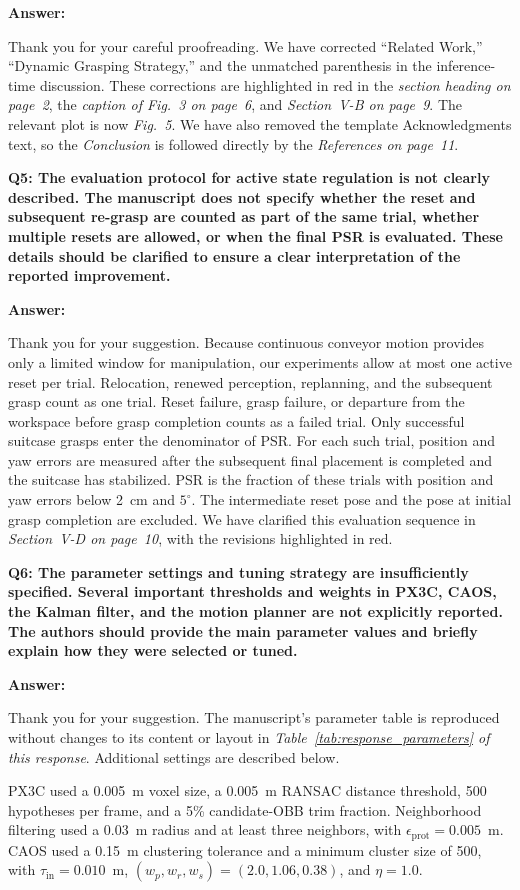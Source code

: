 \documentclass[journal,10pt]{IEEEtran}
\newcommand{\question}[2]{%
  \par\smallskip\noindent
  {\color{responseblue}\bfseries\clubpenalty=10000\widowpenalty=10000 Q#1: #2\par}%
  \par\nobreak\noindent
}
\newcommand{\answer}{%
  \par\smallskip\noindent
  \textbf{Answer: }\ignorespaces
}
\begin{document}
\answer
Thank you for your careful proofreading. We have corrected ``Related Work,'' ``Dynamic Grasping Strategy,'' and the unmatched parenthesis in the inference-time discussion. These corrections are highlighted in red in the \textit{section heading on page~2}, the \textit{caption of Fig.~3 on page~6}, and \textit{Section~V-B on page~9}. The relevant plot is now \textit{Fig.~5}. We have also removed the template Acknowledgments text, so the \textit{Conclusion} is followed directly by the \textit{References on page~11}.

\question{5}{The evaluation protocol for active state regulation is not clearly described.
The manuscript does not specify whether the reset and subsequent re-grasp are counted as part of the same trial, whether multiple resets are allowed, or when the final PSR is evaluated. These details should be clarified to ensure a clear interpretation of the reported improvement.}

\answer
Thank you for your suggestion. Because continuous conveyor motion provides only a limited window for manipulation, our experiments allow at most one active reset per trial. Relocation, renewed perception, replanning, and the subsequent grasp count as one trial. Reset failure, grasp failure, or departure from the workspace before grasp completion counts as a failed trial. Only successful suitcase grasps enter the denominator of PSR. For each such trial, position and yaw errors are measured after the subsequent final placement is completed and the suitcase has stabilized. PSR is the fraction of these trials with position and yaw errors below 2~cm and $5^{\circ}$. The intermediate reset pose and the pose at initial grasp completion are excluded. We have clarified this evaluation sequence in \textit{Section~V-D on page~10}, with the revisions highlighted in red.

\question{6}{The parameter settings and tuning strategy are insufficiently specified.
Several important thresholds and weights in PX3C, CAOS, the Kalman filter, and the motion planner are not explicitly reported. The authors should provide the main parameter values and briefly explain how they were selected or tuned.}

\answer
Thank you for your suggestion. The manuscript's parameter table is reproduced without changes to its content or layout in \textit{Table~\ref{tab:response_parameters} of this response}. Additional settings are described below.

PX3C used a 0.005~m voxel size, a 0.005~m RANSAC distance threshold, 500 hypotheses per frame, and a 5\% candidate-OBB trim fraction. Neighborhood filtering used a 0.03~m radius and at least three neighbors, with $\epsilon_{\mathrm{prot}}=0.005$~m. CAOS used a 0.15~m clustering tolerance and a minimum cluster size of 500, with $\tau_{\mathrm{in}}=0.010$~m, $(w_p,w_r,w_s)=(2.0,1.06,0.38)$, and $\eta=1.0$.
\end{document}
